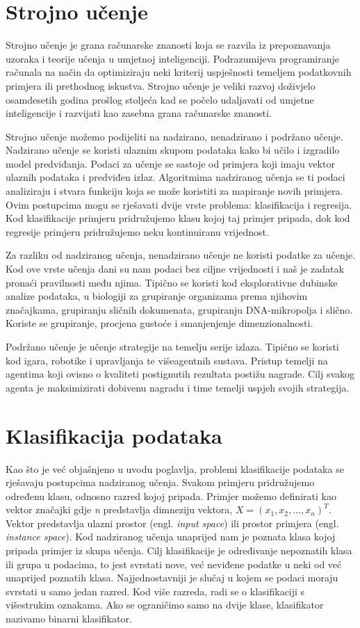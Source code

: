 \documentclass[times, utf8, zavrsni]{fer}
\begin{document}
\section{Strojno učenje}
Strojno učenje je grana računarske znanosti koja se razvila iz prepoznavanja uzoraka i teorije učenja u umjetnoj inteligenciji. Podrazumijeva programiranje računala na način da optimiziraju neki kriterij uspješnosti temeljem podatkovnih primjera ili prethodnog iskustva. Strojno učenje je veliki razvoj doživjelo osamdesetih godina prošlog stoljeća kad se počelo udaljavati od umjetne inteligencije i razvijati kao zasebna grana računarske znanosti.

Strojno učenje možemo podijeliti na nadzirano, nenadzirano i podržano učenje. Nadzirano učenje se koristi ulaznim skupom podataka kako bi učilo i izgradilo model predviđanja. Podaci za učenje se sastoje od primjera koji imaju vektor ulaznih podataka i predviđen izlaz. Algoritmima nadziranog učenja se ti podaci analiziraju i stvara funkciju koja se može koristiti za mapiranje novih primjera. Ovim postupcima mogu se rješavati dvije vrste problema: klasifikacija i regresija. Kod klasifikacije primjeru pridružujemo klasu kojoj taj primjer pripada, dok kod regresije primjeru pridružujemo neku kontinuiranu vrijednost.

Za razliku od nadziranog učenja, nenadzirano učenje ne koristi podatke za učenje. Kod ove vrste učenja dani su nam podaci bez ciljne vrijednosti i naš je zadatak pronaći pravilnosti među njima. Tipično se koristi kod eksplorativne dubinske analize podataka, u biologiji za grupiranje organizama prema njihovim značajkama, grupiranju sličnih dokumenata, grupiranju DNA-mikropolja i slično. Koriste se grupiranje, procjena gustoće i smanjenjenje dimenzionalnosti.

Podržano učenje je učenje strategije na temelju serije izlaza. Tipično se koristi kod igara, robotike i upravljanja te višeagentnih sustava. Pristup temelji na agentima koji ovisno o kvaliteti postignutih rezultata postižu nagrade. Cilj svakog agenta je maksimizirati dobivenu nagradu i time temelji uspjeh svojih strategija. 

\section{Klasifikacija podataka}

Kao što je već objašnjeno u uvodu poglavlja, problemi klasifikacije podataka se rješavaju postupcima nadziranog učenja. Svakom primjeru pridružujemo određenu klasu, odnosno razred kojoj pripada. Primjer možemo definirati kao vektor značajki gdje \textit{n} predstavlja dimneziju vektora, $X = (x_1, x_2,..., x_n)^T$. Vektor predstavlja ulazni prostor (engl. \textit{input space}) ili prostor primjera (engl. \textit{instance space}). Kod nadziranog učenja unaprijed nam je poznata klasa kojoj pripada primjer iz skupa učenja. Cilj klasifikacije je određivanje nepoznatih klasa ili grupa u podacima, to jest svrstati nove, već neviđene podatke u neki od već unaprijed poznatih klasa. Najjednostavniji je slučaj u kojem se podaci moraju svrstati u samo jedan razred. Kod više razreda, radi se o klasifikaciji s višestrukim oznakama. Ako se ograničimo samo na dvije klase, klasifikator nazivamo binarni klasifikator. 
\end{document}
